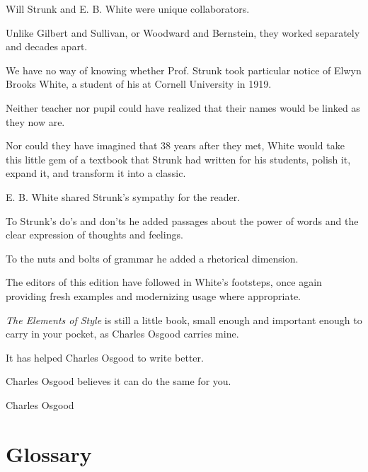 \documentclass{book}
\numberwithin{equation}{section}
\begin{document}
Will Strunk and E. B. White were unique collaborators.

Unlike Gilbert and Sullivan, or Woodward and Bernstein, they worked separately and decades apart.

%
We have no way of knowing whether Prof. Strunk took particular notice of Elwyn Brooks White, a student of his at Cornell University in 1919.

Neither teacher nor pupil could have realized that their names would be linked as they now are.

Nor could they have imagined that 38 years after they met, White would take this little gem of a textbook that Strunk had written for his students, polish it, expand it, and transform it into a classic.

%
E. B. White shared Strunk's sympathy for the reader.

To Strunk's do's and don'ts he added passages about the power of words and the clear expression of thoughts and feelings.

To the nuts and bolts of grammar he added a rhetorical dimension.

%
The editors of this edition have followed in White's footsteps, once again providing fresh examples and modernizing usage where appropriate.

\textit{The Elements of Style} is still a little book, small enough and important enough to carry in your pocket, as Charles Osgood carries mine.

It has helped Charles Osgood to write better.

Charles Osgood believes it can do the same for you.

\begin{flushright}
    Charles Osgood
\end{flushright}


\chapter{Glossary}
\end{document}
